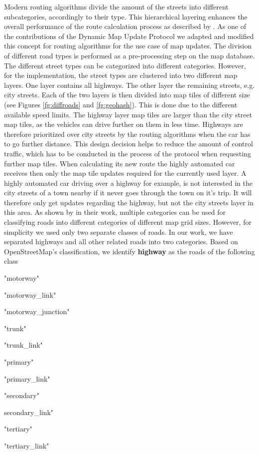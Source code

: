 Modern routing algorithms divide the amount of the streets into different subcategories, accordingly to their type. This hierarchical layering enhances the overall performance of the route calculation process as described by \citet{min2011system}. As one of the contributions of the Dynamic Map Update Protocol we adapted and modified this concept for routing algorithms for the use case of map updates. The division of different road types is performed as a pre-processing step on the map database. The different street types can be categorized into different categories. However, for the implementation, the street types are clustered into two different map layers. One layer contains all highways. The other layer the remaining streets, e.g. city streets. Each of the two layers is then divided into map tiles of different size (see Figures \ref{fg:diffroads} and \ref{fg:geohash}). This is done due to the different available speed limits. The highway layer map tiles are larger than the city street map tiles, as the vehicles can drive further on them in less time. Highways are therefore prioritized over city streets by the routing algorithms when the car has to go further distance. This design decision helps to reduce the amount of control traffic, which has to be conducted in the process of the protocol when requesting further map tiles. When calculating its new route the highly automated car receives then only the map tile updates required for the currently used layer. A highly automated car driving over a highway for example, is not interested in the city streets of a town nearby if it never goes through the town on it's trip. It will therefore only get updates regarding the highway, but not the city streets layer in this area. As shown by \citet{fischer2012technique} in their work, multiple categories can be used for classifying roads into different categories of different map grid sizes. However, for simplicity we used only two separate classes of roads. In our work, we have separated highways and all other related roads into two categories. Based on OpenStreetMap's classification, we identify \textbf{highway} as the roads of the following class
\begin{itemize}
\item "motorway"
\item "motorway{\_}link"
\item "motorway{\_}junction"
\item "trunk"
\item "trunk{\_}link"
\item "primary"
\item "primary{\_}link"
\item "secondary"
\item {secondary{\_}link"
\item "tertiary"
\item "tertiary{\_}link"
}\end{itemize}

